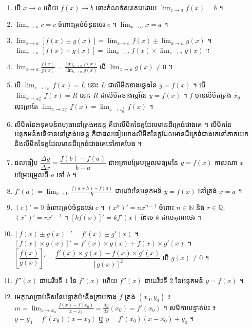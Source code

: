 \begin{note}[មេរៀនសង្ខេប]
\begin{enumerate}[1]
  \item បើ $x \to a$ ហើយ $f(x) \to b$ នោះកំណត់សរសេរដោយ $\displaystyle\lim_{x \to a} f(x) = b$ ។
  \item $\displaystyle\lim_{x \to a} c = c$ ចំពោះគ្រប់ចំនួនថេរ $c$ ។ \quad $\displaystyle\lim_{x \to a} x = a$ ។
  \item $\displaystyle\lim_{x \to a}[f(x) \pm g(x)] = \lim_{x \to a} f(x) \pm \lim_{x \to a} g(x)$ ។ \quad $\displaystyle\lim_{x \to a}[f(x)\times g(x)] = \lim_{x \to a} f(x)\times\lim_{x \to a} g(x)$ ។
  \item $\displaystyle\lim_{x \to a}\frac{f(x)}{g(x)} = \frac{\lim_{x \to a} f(x)}{\lim_{x \to a} g(x)}$ បើ $\displaystyle\lim_{x \to a} g(x) \ne 0$ ។
  \item បើ $\displaystyle\lim_{x \to x_0^-} f(x) = L$ នោះ $L$ ជាលីមីតខាងឆ្វេងនៃ $y = f(x)$ ។ បើ $\displaystyle\lim_{x \to x_0^+} f(x) = R$ នោះ $R$ ជាលីមីតខាងស្ដាំនៃ $y = f(x)$ ។ $f$ មានលីមីតត្រង់ $x_0$ លុះត្រាតែ $\displaystyle\lim_{x \to x_0^-} f(x) = \lim_{x \to x_0^+} f(x)$ ។
  \item លីមីតនៃអនុគមន៍ពហុធានៅត្រង់អនន្ត គឺជាលីមីតនៃតួដែលមានដឺក្រេធំជាងគេ ។ លីមីតនៃអនុគមន៍សនិទាននៅត្រង់អនន្ត គឺជាផលធៀបរវាងលីមីតនៃតួដែលមានដឺក្រេធំជាងគេនៅភាគយក និងលីមីតនៃតួដែលមានដឺក្រេធំជាងគេនៅភាគបែង ។
  \item ផលធៀប $\dfrac{\Delta y}{\Delta x} = \dfrac{f(b) - f(a)}{b - a}$ ជាអត្រាបម្រែបម្រួលមធ្យមនៃ $y = f(x)$ កាលណា $x$ បម្រែបម្រួលពី $a$ ទៅ $b$ ។
  \item $f'(a) = \displaystyle\lim_{h \to 0}\frac{f(a + h) - f(a)}{h}$ ជាដេរីវេនៃអនុគមន៍ $y = f(x)$ នៅត្រង់ $x = a$ ។
  \item $(c)' = 0$ ចំពោះគ្រប់ចំនួនថេរ $c$ ។ $(x^n)' = nx^{n-1}$ ចំពោះ $n \in \mathbb{N}$ និង $r \in \mathbb{Q}$, $(x^r)' = rx^{r-1}$ ។ $[kf(x)]' = kf'(x)$ ដែល $k$ ជាមេគុណថេរ ។
  \item $[f(x) \pm g(x)]' = f'(x) \pm g'(x)$ ។ $[f(x)\times g(x)]' = f'(x)\times g(x) + f(x)\times g'(x)$ ។ $\left[\dfrac{f(x)}{g(x)}\right]' = \dfrac{f'(x)\times g(x) - f(x)\times g'(x)}{[g(x)]^2}$ បើ $g(x) \ne 0$ ។
  \item $f''(x)$ ជាដេរីវេទី $1$ នៃ $f'(x)$ ហើយ $f''(x)$ ជាដេរីវេទី $2$ នៃអនុគមន៍ $y = f(x)$ ។
  \item មេគុណប្រាប់ទិសនៃបន្ទាត់ប៉ះនឹងក្រាបតាង $f$ ត្រង់ $(x_0, y_0)$ ៖ $m = \displaystyle\lim_{x \to x_0}\frac{f(x) - f(x_0)}{x - x_0} = \frac{dy}{dx}(x_0) = f'(x_0)$ ។ សមីការបន្ទាត់ប៉ះ ៖ $y - y_0 = f'(x_0)(x - x_0)$ ឬ $y = f'(x_0)(x - x_0) + y_0$ ។

\end{enumerate}
\end{note}

